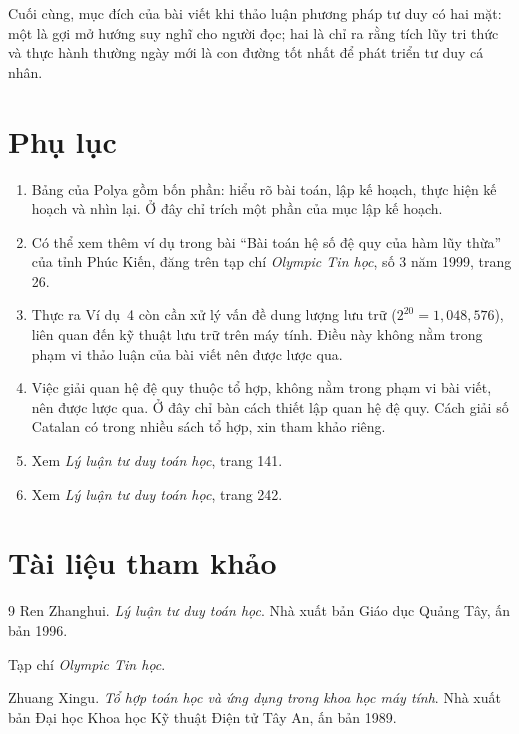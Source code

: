 \documentclass[11pt]{article}
\begin{document}
Cuối cùng, mục đích của bài viết khi thảo luận phương pháp tư duy có hai mặt:
một là gợi mở hướng suy nghĩ cho người đọc; hai là chỉ ra rằng tích lũy tri
thức và thực hành thường ngày mới là con đường tốt nhất để phát triển tư duy
cá nhân.

\section*{Phụ lục}

\begin{enumerate}
  \item Bảng của Polya gồm bốn phần: hiểu rõ bài toán, lập kế hoạch, thực hiện
  kế hoạch và nhìn lại. Ở đây chỉ trích một phần của mục lập kế hoạch.
  \item Có thể xem thêm ví dụ trong bài ``Bài toán hệ số đệ quy của hàm lũy
  thừa'' của tỉnh Phúc Kiến, đăng trên tạp chí \textit{Olympic Tin học}, số 3
  năm 1999, trang 26.
  \item Thực ra Ví dụ~4 còn cần xử lý vấn đề dung lượng lưu trữ
  (\(2^{20}=1{,}048{,}576\)), liên quan đến kỹ thuật lưu trữ trên máy tính.
  Điều này không nằm trong phạm vi thảo luận của bài viết nên được lược qua.
  \item Việc giải quan hệ đệ quy thuộc tổ hợp, không nằm trong phạm vi bài
  viết, nên được lược qua. Ở đây chỉ bàn cách thiết lập quan hệ đệ quy. Cách
  giải số Catalan có trong nhiều sách tổ hợp, xin tham khảo riêng.
  \item Xem \textit{Lý luận tư duy toán học}, trang 141.
  \item Xem \textit{Lý luận tư duy toán học}, trang 242.
\end{enumerate}

\section*{Tài liệu tham khảo}

\begin{thebibliography}{9}
Ren Zhanghui.
\textit{Lý luận tư duy toán học}.
Nhà xuất bản Giáo dục Quảng Tây, ấn bản 1996.

Tạp chí \textit{Olympic Tin học}.

Zhuang Xingu.
\textit{Tổ hợp toán học và ứng dụng trong khoa học máy tính}.
Nhà xuất bản Đại học Khoa học Kỹ thuật Điện tử Tây An, ấn bản 1989.
\end{thebibliography}
\end{document}
